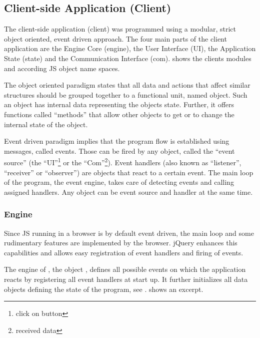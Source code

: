 \subsection{Client-side Application (Client)}
\label{sec:client}

The client-side application (client) was programmed using a modular, strict object oriented, event driven approach.
The four main parts of the client application are the Engine Core (engine), the User Interface (UI), the Application State (state) and the Communication Interface (com).
 shows the clients modules and according JS object name spaces.


The object oriented paradigm states that all data and actions that affect similar structures should be grouped together to a functional unit, named object.
Such an object has internal data representing the objects state.
Further, it offers functions called ``methods'' that allow other objects to get or to change the internal state of the object.

Event driven paradigm implies that the program flow is established using messages, called events.
Those can be fired by any object, called the ``event source'' (the ``UI''\footnote{click on button} or the ``Com''\footnote{received data}).
Event handlers (also known as ``listener'', ``receiver'' or ``observer'') are objects that react to a certain event.
The main loop of the program, the event engine, takes care of detecting events and calling assigned handlers.
Any object can be event source and handler at the same time.


\subsubsection{Engine}
\label{sec:engine}

Since JS running in a browser is by default event driven, the main loop and some rudimentary features are implemented by the browser.
jQuery enhances this capabilities and allows easy registration of event handlers and firing of events.

The engine of \spl, the object , defines all possible events on which the application reacts by registering all event handlers at start up.
It further initializes all data objects defining the state of the program, see .
 shows an excerpt.

